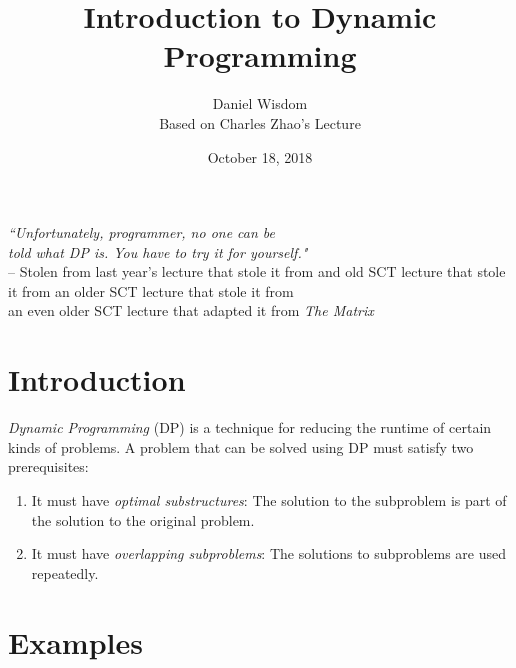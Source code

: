 \documentclass[11pt]{article}
\title{Introduction to Dynamic Programming}
\author{Daniel Wisdom \\Based on Charles Zhao's Lecture}
\date{October 18, 2018}
\begin{document}
\maketitle


\begin{center}
    \textit{``Unfortunately, programmer, no one can be\\ told what DP is.
You have to try it for yourself."}\\
    \medskip
    -- Stolen from last year's lecture that stole it from and old SCT lecture that stole it from an older SCT lecture that stole it from\\ an even older SCT lecture that adapted it from \textit{The Matrix}
\end{center}


\section{Introduction}
\textit{Dynamic Programming} (DP) is a technique for reducing the runtime of certain kinds of problems. A problem that can be solved using DP must satisfy two prerequisites:
\begin{enumerate}
    \item It must have \textit{optimal substructures}: The solution to the subproblem is part of the solution to the original problem.
\item It must have \textit{overlapping subproblems}: The solutions to subproblems are used repeatedly.
\end{enumerate}


\section{Examples}
\end{document}
